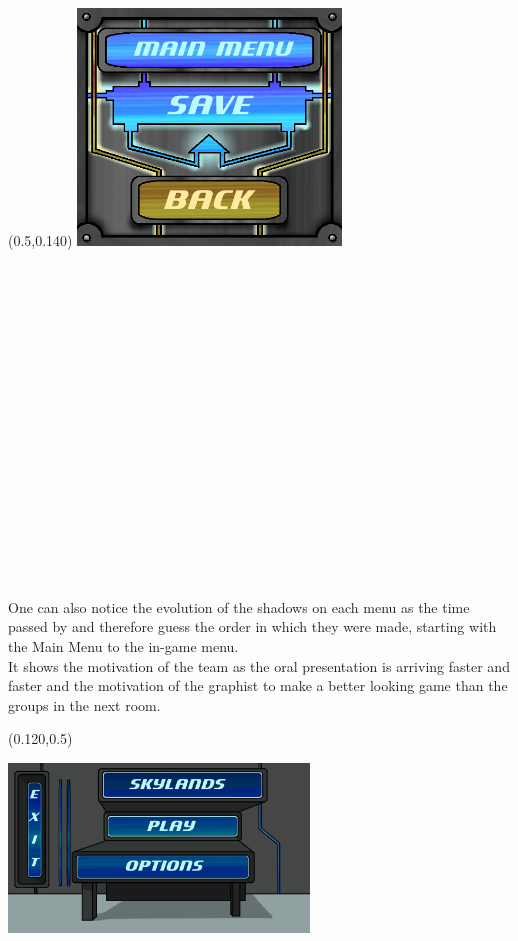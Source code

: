 \documentclass[article]{report}         %
\begin{document}
\begin{textblock}{0.5}(0.5,0.140)
\includegraphics[width=7cm]{images/Skins/ingame_menu_back.png}
\end{textblock}


~\\~\\~\\~\\~\\~\\~\\~\\~\\~\\~\\~\\~\\~\\~\\~\\~\\

One can also notice the evolution of the shadows on each menu as the time passed by and therefore guess the order in which they were made, starting with the Main Menu to the in-game menu.\\
It shows the motivation of the team as the oral presentation is arriving faster and faster and the motivation of the graphist to make a better looking game than the groups in the next room. \\

\begin{textblock}{0.5}(0.120,0.5)

\includegraphics[width=8cm]{images/Menus/Menu_Normal_view.png}

\end{textblock}
\end{document}
